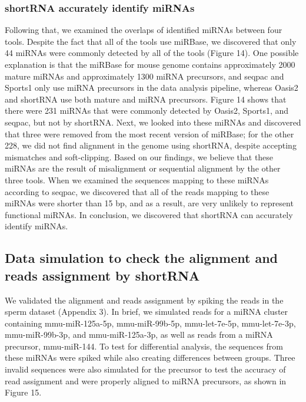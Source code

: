 \documentclass[12pt,twoside]{reedthesis}
\begin{document}
\hypertarget{shortrna-accurately-identify-mirnas}{%
\subsubsection{shortRNA accurately identify miRNAs}\label{shortrna-accurately-identify-mirnas}}

Following that, we examined the overlaps of identified miRNAs between
four tools. Despite the fact that all of the tools use miRBase, we
discovered that only 44 miRNAs were commonly detected by all of the
tools (Figure 14). One possible explanation is that the miRBase for
mouse genome contains approximately 2000 mature miRNAs and approximately
1300 miRNA precursors, and seqpac and Sports1 only use miRNA precursors
in the data analysis pipeline, whereas Oasis2 and shortRNA use both
mature and miRNA precursors. Figure 14 shows that there were 231 miRNAs
that were commonly detected by Oasis2, Sports1, and seqpac, but not by
shortRNA. Next, we looked into these miRNAs and discovered that three
were removed from the most recent version of miRBase; for the other 228,
we did not find alignment in the genome using shortRNA, despite
accepting mismatches and soft-clipping. Based on our findings, we
believe that these miRNAs are the result of misalignment or sequential
alignment by the other three tools. When we examined the sequences
mapping to these miRNAs according to seqpac, we discovered that all of
the reads mapping to these miRNAs were shorter than 15 bp, and as a
result, are very unlikely to represent functional miRNAs. In conclusion,
we discovered that shortRNA can accurately identify miRNAs.

\hypertarget{data-simulation-to-check-the-alignment-and-reads-assignment-by-shortrna}{%
\subsection{Data simulation to check the alignment and reads assignment by shortRNA}\label{data-simulation-to-check-the-alignment-and-reads-assignment-by-shortrna}}

We validated the alignment and reads assignment by spiking the reads in
the sperm dataset (Appendix 3). In brief, we simulated reads for a miRNA
cluster containing mmu-miR-125a-5p, mmu-miR-99b-5p, mmu-let-7e-5p,
mmu-let-7e-3p, mmu-miR-99b-3p, and mmu-miR-125a-3p, as well as reads
from a miRNA precursor, mmu-miR-144. To test for differential analysis,
the sequences from these miRNAs were spiked while also creating
differences between groups. Three invalid sequences were also simulated
for the precursor to test the accuracy of read assignment and were
properly aligned to miRNA precursors, as shown in Figure 15.
\end{document}
